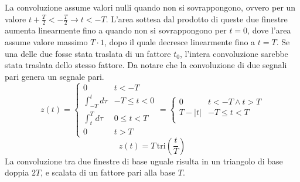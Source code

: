 \documentclass{article}
\begin{document}
La convoluzione assume valori nulli quando non si sovrappongono, ovvero per un valore $t+\displaystyle\frac{T}{2}<-\frac{T}{2}\to t<-T$. L'area sottesa dal prodotto 
di queste due finestre aumenta linearmente fino a quando non si sovrappongono per $t=0$, dove l'area assume valore massimo $T\cdot 1$, dopo il quale 
decresce linearmente fino a $t=T$. Se una delle due fosse stata traslata di un fattore $t_0$, l'intera convoluzione sarebbe stata traslata dello stesso fattore. Da notare 
che la convoluzione di due segnali pari genera un segnale pari.  
\begin{equation*}
    z(t)=\begin{cases}
        0&t<-T\\
        \displaystyle\int_{-T}^td\tau&-T\leq t<0\\
        \displaystyle\int_t^Td\tau&0\leq t<T\\
        0&t>T
    \end{cases}=\begin{cases}
        0&t<-T\land t>T\\
        T-|t|&-T\leq t<T\\
    \end{cases}
\end{equation*}
\begin{equation}
    z(t)=T\,\mbox{tri}\left(\displaystyle\frac{t}{T}\right)
\end{equation}
La convoluzione tra due finestre di base uguale risulta in un triangolo di base doppia $2T$, e scalata di un fattore pari alla base $T$. 

\begin{center}
\end{center}
\end{document}
